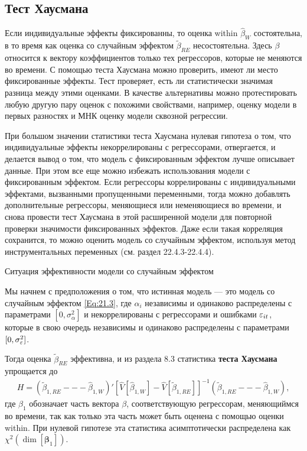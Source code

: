 \subsection{Тест Хаусмана}

Если индивидуальные эффекты фиксированны, то оценка within $\hat{\beta}_W$ состоятельна, в то время как оценка со случайным эффектом $\tilde{\beta}_{RE}$ несостоятельна. Здесь $\beta$ относится к вектору коэффициентов только тех регрессоров, которые не меняются во времени. С помощью теста Хаусмана можно проверить, имеют ли место фиксированные эффекты. Тест проверяет, есть ли статистически значимая разница между этими оценками. В качестве альтернативы можно протестировать любую другую пару оценок с похожими свойствами, например, оценку модели в первых разностях и МНК оценку модели сквозной регрессии.

При большом значении статистики теста Хаусмана нулевая гипотеза о том, что индивидуальные эффекты некоррелированы с регрессорами, отвергается, и делается вывод о том, что модель с фиксированным эффектом лучше описывает данные. При этом все еще можно избежать использования модели с фиксированным эффектом. Если регрессоры коррелированы с индивидуальными эффектами, вызванными пропущенными переменными, тогда можно добавлять дополнительные регрессоры, меняющиеся или неменяющиеся во времени, и снова провести тест Хаусмана в этой расширенной модели для повторной проверки значимости фиксированных эффектов. Даже если такая корреляция сохранится, то можно оценить модель со случайным эффектом, используя метод инструментальных переменных (см. раздел 22.4.3-22.4.4). 

{\centering
Ситуация эффективности модели со  случайным эффектом\\}

Мы начнем с предположения о том, что истинная модель  --- это модель со случайным эффектом \ref{Eq:21.3}, где $\alpha_i$ независимы и одинаково распределены с параметрами $[0,\sigma^2_{\alpha}]$ и некоррелированы с регрессорами и ошибками $\varepsilon_{it}$, которые в свою очередь независимы и одинаково распределены с параметрами $[0,\sigma^2_{\varepsilon}]$.

Тогда оценка $\tilde{\beta}_{RE}$ эффективна, и из раздела 8.3 статистика \textbf{теста Хаусмана} упрощается до
\begin{align}
H=\left(\tilde{\beta}_{1,RE} --- \hat{\beta}_{1,W}\right)' \left[\hat{V}[\hat{\beta}_{1,W}]-\hat{V}[\tilde{\beta}_{1,RE}]\right]^{-1} \left(\tilde{\beta}_{1,RE} --- \hat{\beta}_{1,W}\right),
\nonumber
\end{align}
где $\beta_1$ обозначает часть вектора $\beta$, соответствующую регрессорам, меняющиймся во времени, так как только эта часть может быть оценена с помощью оценки within. При нулевой гипотезе эта статистика асимптотически распределена как $\chi^2(\dim[\bm\beta_1])$.

